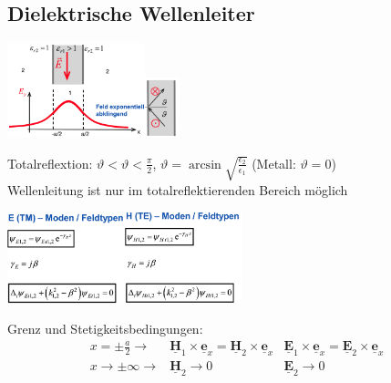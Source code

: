 \documentclass[english]{latex4ei/latex4ei_sheet}
\renewcommand{\vec}[1]{\underline{\boldsymbol{#1}}}
\begin{document}
\begin{sectionbox}
    \subsection{Dielektrische Wellenleiter}
    \begin{center}\includegraphics[width = 4cm]{./img/dielektr2.png}\includegraphics[width = 1cm]{./img/dielektr.png}\end{center}
    Totalreflextion: $\vartheta < \vartheta < \frac{\pi}{2}$, $\vartheta = \operatorname{arcsin}\sqrt{\frac{\epsilon_2}{\epsilon_1}}$ (Metall: $\vartheta = 0$)\\
    Wellenleitung ist nur im totalreflektierenden Bereich möglich\\
    \begin{center}\includegraphics[width = 3.4cm]{./img/dielektr-tm.png}\includegraphics[width = 3.4cm]{./img/dielektr-te.png}\end{center}
    Grenz und Stetigkeitsbedingungen:\\
    $$\begin{array}{lll}
            x=\pm \frac{a}{2} \rightarrow        & \vec{H}_{1} \times \vec{e}_{x}=\vec{H}_{2} \times \vec{e}_{x} & \vec{E}_{1} \times \vec{e}_{x}=\vec{E}_{2} \times \vec{e}_{x} \\
            x \rightarrow \pm \infty \rightarrow & \vec{H}_{2} \rightarrow 0                                     & \vec{E}_{2} \rightarrow 0
        \end{array}$$

\end{sectionbox}
\end{document}
